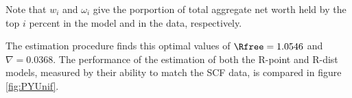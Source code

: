 \documentclass[\econtexRoot/Chp1proposal]{subfiles}
\begin{document}
\par Note that $w_i$ and $\omega_i$ give the porportion of total aggregate net worth held by the top $i$ percent in the model and in the data, respectively.

\par The estimation procedure finds this optimal values of $\Rfree = 1.0546$ and $\nabla = 0.0368$. The performance of the estimation of both the R-point and R-dist models, measured by their ability to match the SCF data, is compared in figure \ref{fig:PYUnif}.




\onlyinsubfile{}

\end{document}
